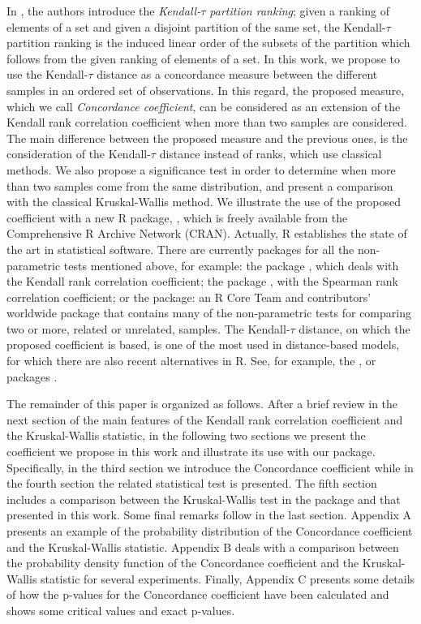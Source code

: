 In \cite{Aparicio2020}, the  authors introduce the \emph{Kendall-$\tau$ partition ranking}; given a ranking of elements of a set and given a disjoint partition of the same set, the Kendall-$\tau$ partition ranking is the induced linear order of the subsets of the partition which follows from the given ranking of elements of a set. In this work, we propose to use the Kendall-$\tau$ distance as a concordance measure between the different samples in an ordered set of observations. In this regard, the proposed measure, which we call \emph{Concordance coefficient}, can be considered as an extension of the Kendall rank correlation coefficient when more than two samples are considered. The main difference between the proposed measure and the previous ones, is the consideration of the Kendall-$\tau$ distance instead of ranks, which use classical methods. We also propose a significance test in order to determine when more than two samples come from the same distribution, and present a comparison with the classical Kruskal-Wallis method. We illustrate the use of the proposed coefficient with a new R package,  \citep{ConcordanceTest2022}, which is freely available from the Comprehensive R Archive Network (CRAN). Actually, R establishes the state of the art in statistical software. There are currently packages for all the non-parametric tests mentioned above, for example: the  package \citep{KendallPackage2011}, which deals with the Kendall rank correlation coefficient; the  package \citep{pspearmanPackage2014}, with the Spearman rank correlation coefficient; or the  package: an R Core Team and contributors' worldwide package that contains many of the non-parametric tests for comparing two or more, related or unrelated, samples. The Kendall-$\tau$ distance, on which the proposed coefficient is based, is one of the most used in distance-based models, for which there are also recent alternatives in R. See, for example, the  \citep{Irurozki2016},  \citep{Qian2019} or  packages \citep{Sorensen2020}.

The remainder of this paper is organized as follows. After a brief review in the next section of the main features of the  Kendall rank correlation coefficient and the Kruskal-Wallis statistic, in the following two sections we present the coefficient we propose in this work and illustrate its use with our  package. Specifically, in the third section we introduce the Concordance coefficient while in the fourth section the related statistical test is presented. The fifth section includes a comparison between the Kruskal-Wallis test in the  package and that presented in this work. Some final remarks follow in the last section. Appendix A presents an example of the probability distribution of the Concordance coefficient and the Kruskal-Wallis statistic. Appendix B deals with a comparison between the probability density function of the Concordance coefficient and the Kruskal-Wallis statistic for several experiments. Finally, Appendix C presents some details of how the p-values for the Concordance coefficient have been calculated and shows some critical values and exact p-values.

